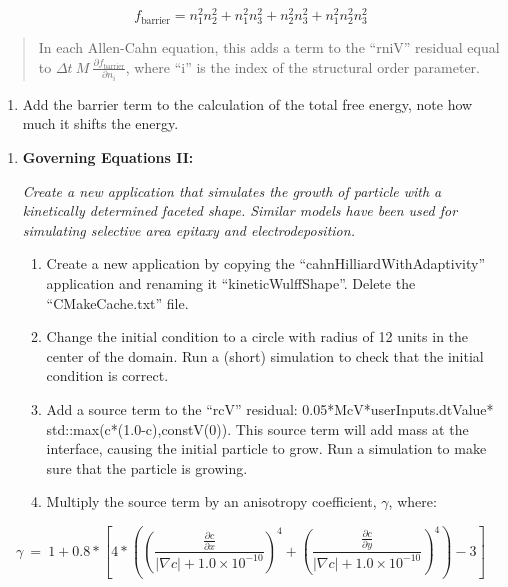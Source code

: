 \documentclass[]{article}
\begin{document}
\[f_{\text{barrier}} = n_{1}^{2}n_{2}^{2} + n_{1}^{2}n_{3}^{2} + n_{2}^{2}n_{3}^{2} + n_{1}^{2}n_{2}^{2}n_{3}^{2}\]

\begin{quote}
In each Allen-Cahn equation, this adds a term to the ``rniV'' residual
equal to
\(\Delta t\ M\ \frac{\partial f_{\text{barrier}}}{\partial n_{i}}\),
where ``i'' is the index of the structural order parameter.
\end{quote}

\begin{enumerate}
\def\labelenumi{\alph{enumi}.}
\item
  Add the barrier term to the calculation of the total free energy, note
  how much it shifts the energy.
\end{enumerate}

\begin{enumerate}
\def\labelenumi{\arabic{enumi}.}
\item
  \textbf{Governing Equations II: }

  \emph{Create a new application that simulates the growth of particle
  with a kinetically determined faceted shape. Similar models have been
  used for simulating selective area epitaxy and electrodeposition.}

  \begin{enumerate}
  \def\labelenumii{\alph{enumii}.}
  \item
    Create a new application by copying the
    ``cahnHilliardWithAdaptivity'' application and renaming it
    ``kineticWulffShape''. Delete the ``CMakeCache.txt'' file.
  \item
    Change the initial condition to a circle with radius of 12 units in
    the center of the domain. Run a (short) simulation to check that the
    initial condition is correct.
  \item
    Add a source term to the ``rcV'' residual:
    0.05*McV*userInputs.dtValue* std::max(c*(1.0-c),constV(0)). This
    source term will add mass at the interface, causing the initial
    particle to grow. Run a simulation to make sure that the particle is
    growing.
  \item
    Multiply the source term by an anisotropy coefficient, \(\gamma\),
    where:
  \end{enumerate}
\end{enumerate}

\[\gamma\  = \ 1 + 0.8*\left\lbrack 4*\left( \left( \frac{\frac{\partial c}{\partial x}}{\left| \nabla c \right| + 1.0 \times 10^{- 10}} \right)^{4} + \left( \frac{\frac{\partial c}{\partial y}}{\left| \nabla c \right| + 1.0 \times 10^{- 10}} \right)^{4} \right) - 3 \right\rbrack\]
\end{document}

